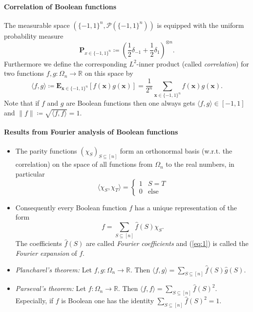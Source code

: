 \documentclass[a4paper]{article}
\newcommand{\prob}{\mathbf{P}}
\newcommand{\expe}{\mathbf{E}}
\newcommand{\real}{\mathbb{R}}
\newcommand{\nset}{[n]}
\newcommand{\boldx}{\boldsymbol{x}}
\theoremstyle{plain}
\theoremstyle{definition}
\theoremstyle{remark}
\begin{document}
\paragraph{Correlation of Boolean functions}
\label{sec:corr-bool-funct}

\noindent The measurable space \(\left(\{-1,1\}^n, \mathcal{P}(\{-1,1\}^n)\right)\)
is equipped with the uniform probability measure \[\prob_{x \in
  \{-1,1\}^n} \coloneqq \left(\frac{1}{2} \delta_{-1} +
  \frac{1}{2}\delta_1\right)^{\otimes n}.\]
Furthermore we define the corresponding \(L^2\)-inner product (called \emph{correlation}) for two
functions \(f,g: \Omega_n \rightarrow \real\) on this space by 
\[\langle f,g\rangle \coloneqq \expe_{\boldx \in
  \{-1,1\}^n}\left[f(\boldx)g(\boldx)\right] = \frac{1}{2^n}\sum_{\boldx \in \{-1,1\}^n} f(\boldx)g(\boldx).\]
Note that if \(f\) and \(g\) are Boolean functions then one always
gets \(\langle f, g\rangle \in [-1,1]\) and \(\|f\| \coloneqq
\sqrt{\langle f, f\rangle } = 1\).  

\paragraph{Results from Fourier analysis of Boolean functions}
\label{sec:results-from-fourier}

\begin{itemize}
\item The parity functions \(\left(\chi_S\right)_{S \subseteq \nset}\)
  form an orthonormal basis (w.r.t. the correlation) on the space of all functions from  \(\Omega_n\) to the real numbers, in particular 
  \[\langle \chi_S, \chi_T\rangle =  \begin{cases}
    1 & S=T \\
    0 & \text{else}
  \end{cases}\]
\item Consequently every Boolean function \(f\) has a unique
  representation of the form 
  \begin{equation}
    \label{eq:1}
    f = \sum_{S\subseteq \nset} \hat{f}(S) \chi_S.
  \end{equation}
  The coefficients \(\hat{f}(S)\) are called \emph{Fourier
    coefficients} and (\ref{eq:1}) is called the \emph{Fourier
    expansion} of \(f\).
\item \emph{Plancharel's theorem:} Let \(f,g: \Omega_n \rightarrow
  \real\). Then \(\langle f, g\rangle = \sum_{S\subseteq \nset}
  \hat{f}(S)\hat{g}(S)\).
\item \emph{Parseval's theorem:} Let \(f: \Omega_n \rightarrow
  \real\). Then \(\langle f, f\rangle = \sum_{S\subseteq \nset}
  \hat{f}(S)^2\). Especially, if \(f\) is Boolean one has the identity \(\sum_{S\subseteq \nset}
  \hat{f}(S)^2 = 1\). 
\end{itemize}
\end{document}
